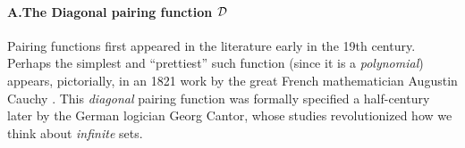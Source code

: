 \paragraph{\small\sf A.The Diagonal pairing function $\mbox{$\cal D$}$}

Pairing functions first appeared in the literature early in the 19th
century.  Perhaps the simplest and ``prettiest'' such function (since
it is a {\em polynomial}) appears, pictorially, in an 1821 work by the
great French mathematician Augustin Cauchy \cite{Cauchy21}.
%
This {\em diagonal} pairing function was formally specified a
half-century later by the German logician Georg Cantor,
%
whose studies \cite{Cantor74,Cantor78} revolutionized how we think
about {\em infinite} sets.

